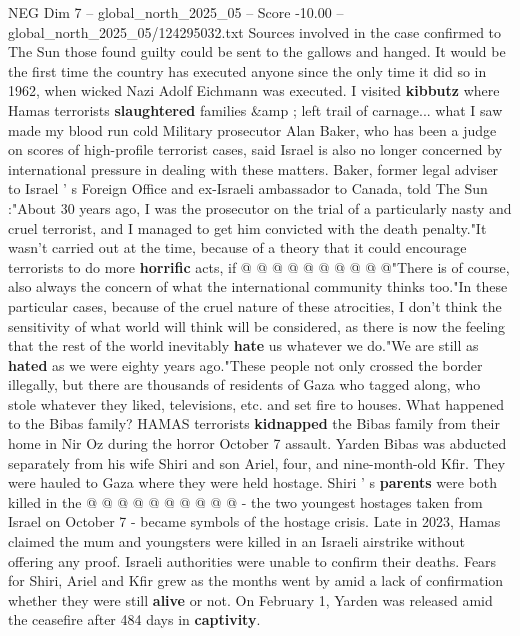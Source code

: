\begin{textsample}{NEG Dim 7 – global\_north\_2025\_05 – Score -10.00 – global\_north\_2025\_05/124295032.txt}  \label{ex:f7_neg_101}
Sources involved in the case confirmed to The Sun those found guilty could be sent to the gallows and hanged.
It would be the first time the country has executed anyone since the only time it did so in 1962, when wicked Nazi Adolf Eichmann was executed.
I visited \textbf{kibbutz} where Hamas terrorists \textbf{slaughtered} families \&amp ; left trail of carnage... what I saw made my blood run cold Military prosecutor Alan Baker, who has been a judge on scores of high-profile terrorist cases, said Israel is also no longer concerned by international pressure in dealing with these matters.
Baker, former legal adviser to Israel ' s Foreign Office and ex-Israeli ambassador to Canada, told The Sun :"About 30 years ago, I was the prosecutor on the trial of a particularly nasty and cruel terrorist, and I managed to get him convicted with the death penalty."It wasn't carried out at the time, because of a theory that it could encourage terrorists to do more \textbf{horrific} acts, if @ @ @ @ @ @ @ @ @ @"There is of course, also always the concern of what the international community thinks too."In these particular cases, because of the cruel nature of these atrocities, I don't think the sensitivity of what world will think will be considered, as there is now the feeling that the rest of the world inevitably \textbf{hate} us whatever we do."We are still as \textbf{hated} as we were eighty years ago."These people not only crossed the border illegally, but there are thousands of residents of Gaza who tagged along, who stole whatever they liked, televisions, etc. and set fire to houses.
What happened to the Bibas family?
HAMAS terrorists \textbf{kidnapped} the Bibas family from their home in Nir Oz during the horror October 7 assault.
Yarden Bibas was abducted separately from his wife Shiri and son Ariel, four, and nine-month-old Kfir.
They were hauled to Gaza where they were held hostage.
Shiri ' s \textbf{parents} were both killed in the @ @ @ @ @ @ @ @ @ @ - the two youngest hostages taken from Israel on October 7 - became symbols of the hostage crisis.
Late in 2023, Hamas claimed the mum and youngsters were killed in an Israeli airstrike without offering any proof.
Israeli authorities were unable to confirm their deaths.
Fears for Shiri, Ariel and Kfir grew as the months went by amid a lack of confirmation whether they were still \textbf{alive} or not.
On February 1, Yarden was released amid the ceasefire after 484 days in \textbf{captivity}.

\end{textsample}
